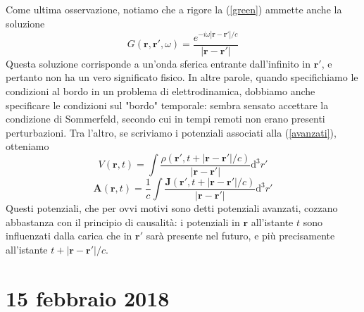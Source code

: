 \documentclass[a4paper,11pt]{book}
\newcommand{\dif}{\mathrm{d}}
\renewcommand{\vec}[1]{\mathbf{#1}}
\theoremstyle{theorem}
\theoremstyle{definition}
\begin{document}
Come ultima osservazione, notiamo che a rigore la (\ref{green}) ammette anche la soluzione
\begin{equation}G(\vec{r},\vec{r}',\omega)=\frac{e^{-i\omega|\vec{r}-\vec{r}'|/c}}{|\vec{r}-\vec{r}'|}\label{avanzati}\end{equation}
Questa soluzione corrisponde a un'onda sferica entrante dall'infinito in $\vec{r}'$, e pertanto non ha un vero significato fisico. In altre parole, quando specifichiamo le condizioni al bordo in un problema di elettrodinamica, dobbiamo anche specificare le condizioni sul "bordo" temporale: sembra sensato accettare la condizione di Sommerfeld, secondo cui in tempi remoti non erano presenti perturbazioni. Tra l'altro, se scriviamo i potenziali associati alla (\ref{avanzati}), otteniamo
\begin{equation*}V(\vec{r},t)=\int\frac{\rho(\vec{r}',t+|\vec{r}-\vec{r}'|/c)}{|\vec{r}-\vec{r}'|}\dif^3r'\end{equation*}
\begin{equation*}\vec{A}(\vec{r},t)=\frac{1}{c}\int\frac{\vec{J}(\vec{r}',t+|\vec{r}-\vec{r}'|/c)}{|\vec{r}-\vec{r}'|}\dif^3r'\end{equation*}
Questi potenziali, che per ovvi motivi sono detti potenziali avanzati, cozzano abbastanza con il principio di causalità: i potenziali in $\vec{r}$ all'istante $t$ sono influenzati dalla carica che in $\vec{r}'$ sarà presente nel futuro, e più precisamente all'istante $t+|\vec{r}-\vec{r}'|/c$.
\newpage
\section{15 febbraio 2018}
\end{document}
